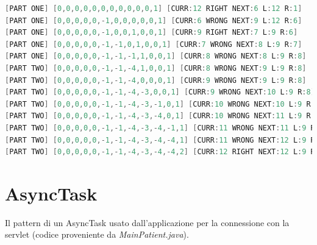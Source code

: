 \documentclass[
	corpo=12pt,
	twoside,
 	evenboxes,
	tipotesi=triennale,
    	stile=classica,
   	 greek,
]{toptesi}
\begin{document}
\begin{enumerate}
\begin{lstlisting}[language=Java, label=lst:debug07, caption={Debug 07}]
[PART ONE] [0,0,0,0,0,0,0,0,0,0,0,1] [CURR:12 RIGHT NEXT:6 L:12 R:1]
[PART ONE] [0,0,0,0,0,-1,0,0,0,0,0,1] [CURR:6 WRONG NEXT:9 L:12 R:6]
[PART ONE] [0,0,0,0,0,-1,0,0,1,0,0,1] [CURR:9 RIGHT NEXT:7 L:9 R:6]
[PART ONE] [0,0,0,0,0,-1,-1,0,1,0,0,1] [CURR:7 WRONG NEXT:8 L:9 R:7]
[PART ONE] [0,0,0,0,0,-1,-1,-1,1,0,0,1] [CURR:8 WRONG NEXT:8 L:9 R:8]
[PART TWO] [0,0,0,0,0,-1,-1,-4,1,0,0,1] [CURR:8 WRONG NEXT:9 L:9 R:8]
[PART TWO] [0,0,0,0,0,-1,-1,-4,0,0,0,1] [CURR:9 WRONG NEXT:9 L:9 R:8]
[PART TWO] [0,0,0,0,0,-1,-1,-4,-3,0,0,1] [CURR:9 WRONG NEXT:10 L:9 R:8]
[PART TWO] [0,0,0,0,0,-1,-1,-4,-3,-1,0,1] [CURR:10 WRONG NEXT:10 L:9 R:8]
[PART TWO] [0,0,0,0,0,-1,-1,-4,-3,-4,0,1] [CURR:10 WRONG NEXT:11 L:9 R:8]
[PART TWO] [0,0,0,0,0,-1,-1,-4,-3,-4,-1,1] [CURR:11 WRONG NEXT:11 L:9 R:8]
[PART TWO] [0,0,0,0,0,-1,-1,-4,-3,-4,-4,1] [CURR:11 WRONG NEXT:12 L:9 R:8]
[PART TWO] [0,0,0,0,0,-1,-1,-4,-3,-4,-4,2] [CURR:12 RIGHT NEXT:12 L:9 R:8]
\end{lstlisting}

\end{enumerate}

\appendix

\chapter{AsyncTask}
\label{chap:asynctask}
Il pattern di un AsyncTask usato dall'applicazione per la connessione con la servlet (codice proveniente da \textit{MainPatient.java}).




\printbibliography[title=Bibliografia, keyword=primary]

\newrefcontext[sorting=none]
\printbibliography[env=bibliographyNUM,title=Sitografia, keyword=secondary, resetnumbers]
\end{document}
